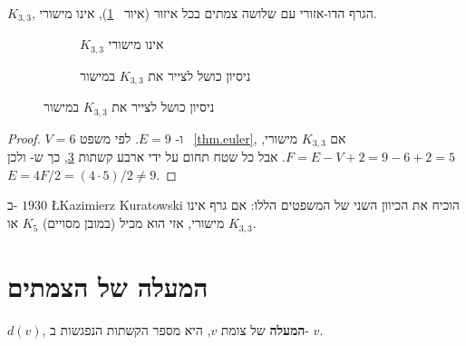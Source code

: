 \begin{theorem}
$K_{3,3}$,
הגרף הדו-אזורי עם שלושה צמתים בכל איזור 
(איור~
\ref{f.five-k33}),
אינו מישורי.
\end{theorem}
\begin{figure}[tb]
\begin{center}
\begin{subfigure}{.4\textwidth}\centering
{}
\caption{$K_{3,3}$ אינו מישורי}\label{f.five-k33}
\end{subfigure}
\hspace{3em}
\begin{subfigure}{.4\textwidth}\centering
{}
\caption{ניסיון כושל לצייר את
$K_{3,3}$
במישור}
\label{f.five-k33-failed}
\end{subfigure}
\end{center}
\end{figure}
\begin{proof}
$V=6$
ו-%
$E=9$.
לפי משפט%
~\ref{thm.euler},
אם
$K_{3,3}$
מישורי,
$F=E-V+2=9-6+2=5$.
אבל כל שטח תחום על ידי ארבע קשתות
\ref{f.five-k33-failed},
כך ש-
 ולכן
$E=4F/2=(4\cdot 5)/2\neq 9$.
\end{proof}

ב-%
$1930$
\L{Kazimierz Kuratowski}
הוכיח את הכיוון השני של המשפטים הללו: אם גרף אינו מישורי, אזי הוא מכיל (במובן מסויים) 
$K_5$
או
$K_{3,3}$.


\section{המעלה של הצמתים}\label{s.degrees}

\begin{definition}
$d(v)$,
\textbf{המעלה}
של צומת
$v$,
היא מספר הקשתות הנפגשות ב-%
$v$.
\end{definition}

